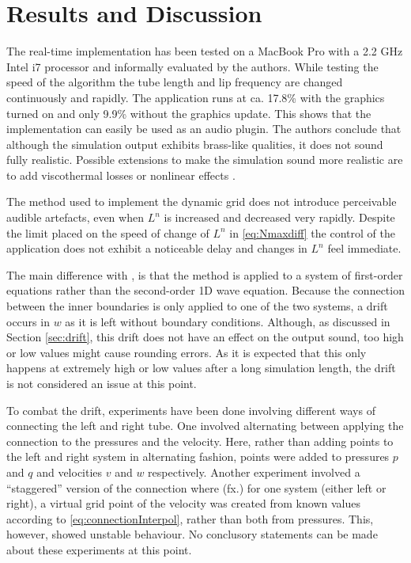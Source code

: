 \section{Results and Discussion}\label{sec:resDisc}
The real-time implementation has been tested on a MacBook Pro with a 2.2 GHz Intel i7 processor and informally evaluated by the authors. While testing the speed of the algorithm the tube length and lip frequency are changed continuously and rapidly. The application runs at ca. 17.8\%  with the graphics turned on and only 9.9\% without the graphics update. This shows that the implementation can easily be used as an audio plugin. The authors conclude that although the simulation output exhibits brass-like qualities, it does not sound fully realistic. Possible extensions to make the simulation sound more realistic are to add viscothermal losses \cite{Harrison2016} or nonlinear effects \cite{msallam1997physical}.

The method used to implement the dynamic grid does not introduce perceivable audible artefacts, even when $L^n$ is increased and decreased very rapidly. Despite the limit placed on the speed of change of $L^n$ in \eqref{eq:Nmaxdiff} the control of the application does not exhibit a noticeable delay and changes in $L^n$ feel immediate.

The main difference with \cite{Willemsen2021}, is that the method is applied to a system of first-order equations rather than the second-order 1D wave equation. Because the connection between the inner boundaries is only applied to one of the two systems, a drift occurs in $w$ as it is left without boundary conditions. Although, as discussed in Section \ref{sec:drift}, this drift does not have an effect on the output sound, too high or low values might cause rounding errors. As it is expected that this only happens at extremely high or low values after a long simulation length, the drift is not considered an issue at this point. 

To combat the drift, experiments have been done involving different ways of connecting the left and right tube. One involved alternating between applying the connection to the pressures and the velocity. Here, rather than adding points to the left and right system in alternating fashion, points were added to pressures $p$ and $q$ and velocities $v$ and $w$ respectively. Another experiment involved a ``staggered'' version of the connection where (fx.) for one system (either left or right), a virtual grid point of the velocity was created from known values according to \eqref{eq:connectionInterpol}, rather than both from pressures. This, however, showed unstable behaviour. No conclusory statements can be made about these experiments at this point. 



